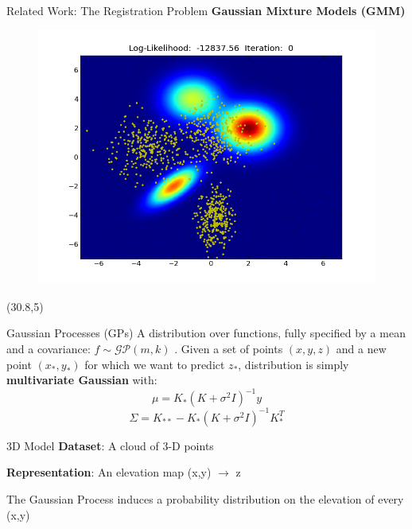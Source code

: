 \documentclass[final]{beamer}
\begin{document}
\begin{frame}{}
\begin{textblock}{27}
\begin{block}{Related Work: The Registration Problem}
{\bf Gaussian Mixture Models (GMM) \cite{jian_robust_5555}}
\begin{figure}
\includegraphics[width=10in]{register2D.png}
\end{figure}

\end{block}
\end{textblock}

\begin{textblock}{27.5}(30.8,5)
\begin{block}{Gaussian Processes (GPs)}
A distribution over functions, fully specified by a mean and a covariance:
$f \sim \mathcal{GP}(m,k)$ \cite{rasmussen2006gaussian}. Given a set of points $(x,y,z)$ and a new point $(x_*,y_*)$ for which we want to predict $z_*$, 
distribution is simply {\bf multivariate Gaussian} with:
$$\mu = K_* (K + \sigma^2 I)^{-1}y$$
$$\Sigma = K_{**} - K_* (K + \sigma^2 I)^{-1} K_*^T$$
\end{block}

\begin{block}{3D Model}
{\bf Dataset}: A cloud of 3-D points

{\bf Representation}: An elevation map (x,y) $\rightarrow$ z

The Gaussian Process induces a probability distribution on the elevation of every (x,y)


\end{block}
\end{textblock}
\end{frame}
\end{document}
